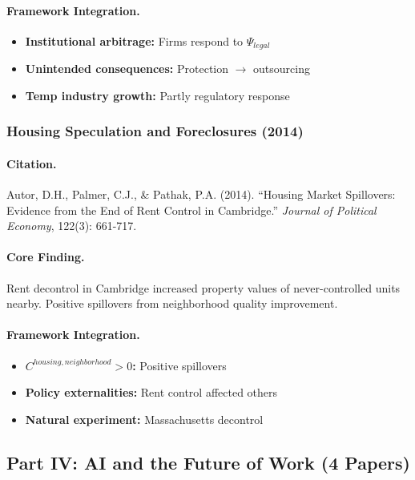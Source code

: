 \documentclass[12pt,a4paper]{article}
\begin{document}
\paragraph{Framework Integration.}
\begin{itemize}
  \item \textbf{Institutional arbitrage:} Firms respond to $\Psi_{legal}$
  \item \textbf{Unintended consequences:} Protection $\to$ outsourcing
  \item \textbf{Temp industry growth:} Partly regulatory response
\end{itemize}

\subsubsection{Housing Speculation and Foreclosures (2014)}

\paragraph{Citation.}
Autor, D.H., Palmer, C.J., \& Pathak, P.A. (2014). ``Housing Market
Spillovers: Evidence from the End of Rent Control in Cambridge.''
\emph{Journal of Political Economy}, 122(3): 661-717.

\paragraph{Core Finding.}
Rent decontrol in Cambridge increased property values of never-controlled
units nearby. Positive spillovers from neighborhood quality improvement.

\paragraph{Framework Integration.}
\begin{itemize}
  \item \textbf{$C^{housing,neighborhood} > 0$:} Positive spillovers
  \item \textbf{Policy externalities:} Rent control affected others
  \item \textbf{Natural experiment:} Massachusetts decontrol
\end{itemize}

\subsection{Part IV: AI and the Future of Work (4 Papers)}
\end{document}
